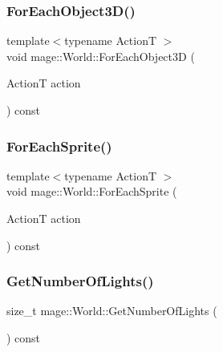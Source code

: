 \subsubsection{\texorpdfstring{For\+Each\+Object3\+D()}{ForEachObject3D()}}
{\footnotesize\ttfamily template$<$typename ActionT $>$ \\
void mage\+::\+World\+::\+For\+Each\+Object3D (\begin{DoxyParamCaption}\item[{ActionT}]{action }\end{DoxyParamCaption}) const}

\hypertarget{classmage_1_1_world_aa81817e1ebc34170d255e2efef1f3134}{}\label{classmage_1_1_world_aa81817e1ebc34170d255e2efef1f3134} 
\subsubsection{\texorpdfstring{For\+Each\+Sprite()}{ForEachSprite()}}
{\footnotesize\ttfamily template$<$typename ActionT $>$ \\
void mage\+::\+World\+::\+For\+Each\+Sprite (\begin{DoxyParamCaption}\item[{ActionT}]{action }\end{DoxyParamCaption}) const}

\hypertarget{classmage_1_1_world_a786420d8d8b97065ee591753b7f1541b}{}\label{classmage_1_1_world_a786420d8d8b97065ee591753b7f1541b} 
\subsubsection{\texorpdfstring{Get\+Number\+Of\+Lights()}{GetNumberOfLights()}}
{\footnotesize\ttfamily size\+\_\+t mage\+::\+World\+::\+Get\+Number\+Of\+Lights (\begin{DoxyParamCaption}{ }\end{DoxyParamCaption}) const}

\hypertarget{classmage_1_1_world_a6e04fdde74a2616746cdafd12537c4a7}{}\label{classmage_1_1_world_a6e04fdde74a2616746cdafd12537c4a7} 
